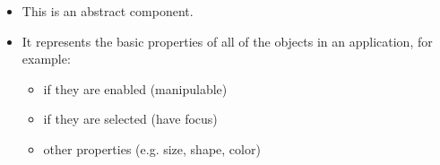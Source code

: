 \begin{itemize}
\item This is an abstract component. 
\item It represents the basic properties of all of the objects in an application, for example:
\begin{itemize}
\item if they are  enabled (manipulable)
\item if they are selected (have focus)
\item other properties (e.g. size, shape, color)
\end{itemize}
\end{itemize}
